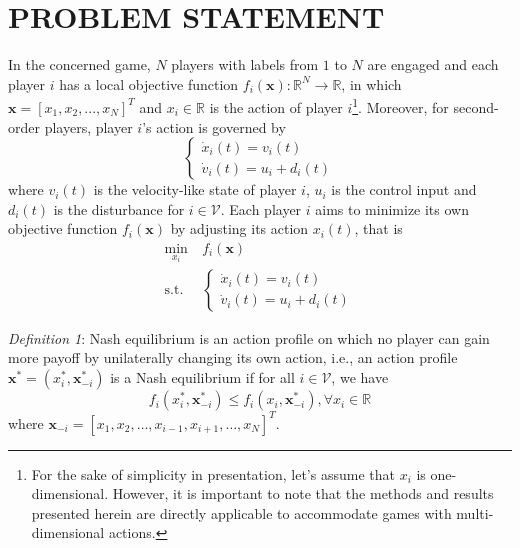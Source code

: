 \documentclass[lettersize,journal]{IEEEtran}
\begin{document}
\section{PROBLEM STATEMENT}
In the concerned game, $N$ players with labels from $1$ to $N$ are engaged and each player $i$ has a local objective function $f_i(\mathbf{x}):\mathbb{R}^N \rightarrow \mathbb{R}$, in which $\mathbf{x} = [x_1,x_2,...,x_N]^T$ and $x_i \in \mathbb{R}$ is the action of player $i$\footnote{
    For the sake of simplicity in presentation, let's assume that $x_i$ is one-dimensional. However, it is important to note that the methods and results presented herein are directly applicable to accommodate games with multi-dimensional actions.
}.
Moreover, for second-order players, player $i$'s action is governed by
\begin{equation}\label{eq1}
    \begin{cases}
        \dot{x}_i(t)=v_i(t) \\
        \dot{v}_i(t)=u_i+d_i(t)
    \end{cases}
\end{equation}
where $v_i(t)$ is the velocity-like state of player $i$, $u_i$ is the control input and $d_i(t)$ is the disturbance for $i \in \mathcal{V}$. Each player $i$ aims to minimize its own objective function $f_i(\mathbf{x})$ by adjusting its action $x_i(t)$, that is
\begin{equation}
    \begin{aligned}
        \min_{x_i}  ~ & f_i(\mathbf{x})        \\
        \text{s.t.} ~ & \begin{cases}
                            \dot{x}_i(t)=v_i(t) \\
                            \dot{v}_i(t)=u_i+d_i(t)
                        \end{cases}
    \end{aligned}
\end{equation}

\emph{Definition 1}: Nash equilibrium is an action profile on which no player can gain more payoff by unilaterally changing its own action, i.e., an action profile $\mathbf{x}^{*}=(x_{i}^{*},\mathbf{x}_{-i}^{*})$ is a Nash equilibrium if for all $i \in \mathcal{V}$, we have
\begin{equation}
    f_i(x_i^*,\mathbf{x}_{-i}^*)\leq f_i(x_i,\mathbf{x}_{-i}^*),\forall x_i\in\mathbb{R}
\end{equation}
where $\mathbf{x}_{-i}=[x_{1},x_{2},\ldots,x_{i-1},x_{i+1},\ldots,x_{N}]^{T}$.
\end{document}
